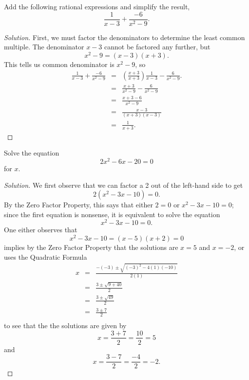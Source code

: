 \documentclass[12pt]{amsart}
\begin{document}
\begin{thm}[16 Points]\label{ex9}
  Add the following rational expressions and simplify the result,
  $$\frac{1}{x - 3} + \frac{-6}{x^2-9}.$$
  \begin{proof}[Solution]
    First, we must factor the denominators to determine the least common multiple.
    The denominator $x - 3$ cannot be factored any further, but
    $$x^2 - 9 = (x - 3)(x + 3).$$
    This tells us common denominator is $x^2 - 9$, so
    \begin{eqnarray*}\frac{1}{x - 3} + \frac{-6}{x^2-9} &=& \left(\frac{x + 3}{x + 3}\right)\frac{1}{x - 3} - \frac{6}{x^2-9}.\\
      &=& \frac{x + 3}{x^2 - 9} - \frac{6}{x^2 - 9}\\
      &=& \frac{x + 3 - 6}{x^2 - 9}\\
      &=& \frac{x - 3}{(x + 3)(x - 3)}\\
      &=& \frac{1}{x + 3}.
    \end{eqnarray*}
  \end{proof}
\end{thm}

\begin{thm}[16 Points]\label{ex10}
  Solve the equation
  $$2x^2 - 6x - 20 = 0$$
  for $x$.
  \begin{proof}[Solution]
    We first observe that we can factor a 2 out of the left-hand side to get
    $$2(x^2 - 3x - 10) = 0.$$
    By the Zero Factor Property, this says that either $2 = 0$ or $x^2 - 3x - 10 = 0$; since the first equation is nonsense, it is equivalent to solve the equation
    $$x^2 - 3x - 10 = 0.$$
    One either observes that
    $$x^2 - 3x - 10 = (x - 5)(x + 2) = 0$$
    implies by the Zero Factor Property that the solutions are $x = 5$ and $x = -2$, or uses the Quadratic Formula
    \begin{eqnarray*}
      x &=& \frac{-(-3) \pm \sqrt{(-3)^2 - 4(1)(-10)}}{2(1)}\\
      &=& \frac{3 \pm \sqrt{9 + 40}}{2}\\
      &=& \frac{3 \pm \sqrt{49}}{2}\\
      &=& \frac{3 \pm 7}{2}\\
    \end{eqnarray*}
    to see that the the solutions are given by
    $$x = \frac{3 + 7}{2} = \frac{10}{2} = 5$$
    and
    $$x = \frac{3 - 7}{2} = \frac{-4}{2} = -2.$$
  \end{proof}
\end{thm}
\end{document}
